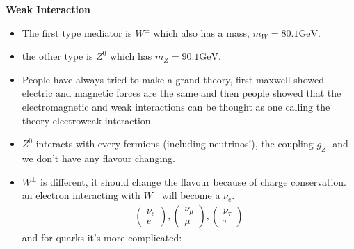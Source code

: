 \documentclass[10pt,a4paper]{article}
\newcounter{theo}
\newcommand{\gev}{\text{GeV}}
\begin{document}
          \textbf{Weak Interaction}
          \begin{itemize}
               \item The first type mediator is $W^{\pm}$ which also has a mass, $m_W = 80.1 \gev$.
               \item the other type is $Z^0$ which has $m_Z = 90.1 \gev$.
               \item People have always tried to make a grand theory, first maxwell showed electric and magnetic forces are the same and then people showed that the electromagnetic and weak interactions can be thought as one calling the theory electroweak interaction.
               \item $Z^0$ interacts with every fermions (including neutrinos!), the coupling $g_Z$. and we don't have any flavour changing.
               \item $W^\pm$ is different, it should change the flavour because of charge conservation. an electron interacting with $W^-$ will become a $\nu_e$.
               \begin{align}
                    \begin{pmatrix}
                         \nu_e \\ e
                    \end{pmatrix} ,
                    \begin{pmatrix}
                         \nu_\mu \\ \mu
                    \end{pmatrix} ,
                    \begin{pmatrix}
                         \nu_\tau \\ \tau
                    \end{pmatrix} 
               \end{align}
               and for quarks it's more complicated:
               

\end{itemize}
\end{document}
